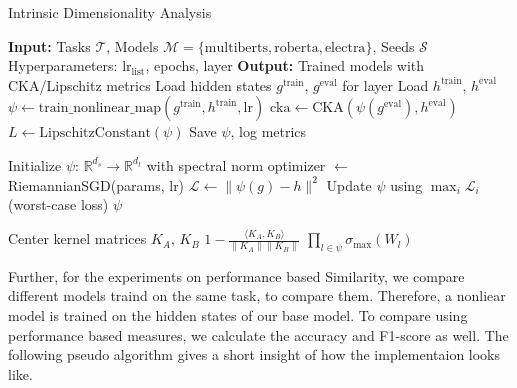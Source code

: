 \begin{algorithm}
\caption{Intrinsic Dimensionality Analysis}
\begin{algorithmic}[htb]

\State \textbf{Input:} 
\State \quad Tasks $\mathcal{T}$, Models $\mathcal{M}=\{\text{multiberts}, \text{roberta}, \text{electra}\}$, Seeds $\mathcal{S}$
\State \quad Hyperparameters: $\text{lr}_\text{list}$, epochs, layer
\State \textbf{Output:} Trained models with CKA/Lipschitz metrics 
            \State Load hidden states $g^{\text{train}}$, $g^{\text{eval}}$ for layer
                    \State Load $h^{\text{train}}$, $h^{\text{eval}}$
                        \State $\psi \gets \text{{train\_nonlinear\_map}}(g^{\text{train}}, h^{\text{train}}, \text{lr})$
                        \State $\text{cka} \gets \text{CKA}(\psi(g^{\text{eval}}), h^{\text{eval}})$
                        \State $L \gets \text{LipschitzConstant}(\psi)$
                        \State Save $\psi$, log metrics
                    \EndFor
                \EndFor
            \EndFor
        \EndFor
    \EndFor
\EndProcedure

    \State Initialize $\psi$: $\mathbb{R}^{d_s} \to \mathbb{R}^{d_t}$ with spectral norm
    \State optimizer $\gets$  RiemannianSGD(params, lr)
        \State $\mathcal{L} \gets \|\psi(g) - h\|^2$
        \State Update $\psi$ using $\max_i \mathcal{L}_i$ (worst-case loss)
    \EndFor 
    \State
    \Return $\psi$
\EndFunction

    \State Center kernel matrices $K_A$, $K_B$
    \State
    \Return $1 - \frac{\langle K_A, K_B \rangle}{\|K_A\| \|K_B\|}$
\EndFunction
{}
    \State
    \Return $\prod_{l\in\psi} \sigma_{\max}(W_l)$ 
\EndFor
\EndFunction

\end{algorithmic}
\end{algorithm}

Further, for the experiments on performance based Similarity,
we compare different models traind on the same task, to compare them.
Therefore, a nonliear model is trained on the hidden states of our base model.
To compare using performance based measures, we calculate the accuracy and F1-score as well.
The following pseudo algorithm gives a short insight of how the implementaion looks like. 
